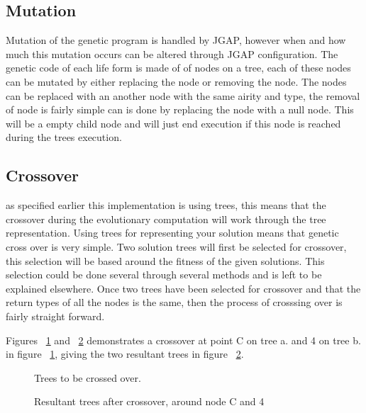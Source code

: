 \documentclass[12pt]{article}
\begin{document}
\subsection{Mutation}

Mutation of the genetic program is handled by JGAP, however when and how much this mutation occurs can be altered through JGAP
configuration. The genetic code of each life form is made of of nodes on a tree, each of these nodes can be mutated by either
replacing the node or removing the node. The nodes can be replaced with an another node with the same airity and type, the
removal of node is fairly simple can is done by replacing the node with a null node. This will be a empty child node and
will just end execution if this node is reached during the trees execution.

\subsection{Crossover}

as specified earlier this implementation is using trees, this means that the crossover during the evolutionary computation
will work through the tree representation. Using trees for representing your solution means that genetic cross over is
very simple. Two solution trees will first be selected for crossover, this selection will be based around the fitness of the given
solutions. This selection could be done several through several methods and is left to be explained elsewhere. Once two trees
have been selected for crossover and that the return types of all the nodes is the same, then the process of crosssing over
is fairly straight forward.

Figures ~\ref{fig:treesab} and ~\ref{fig:resultanttrees} demonstrates a crossover at point C on tree a. and 4 on tree b. in
figure  ~\ref{fig:treesab}, giving the two resultant trees in figure ~\ref{fig:resultanttrees}.

\begin{figure} [ht]
\centering
\subfigure[]{\label{fig:tree-a}\Tree [.1 [ 4 5 6 7 ].2 [ 8 9 ].3 ]}
\hfil
\subfigure[]{\label{fig:tree-b}\Tree [.A [ D E ].B [ F G H I ].C ]}



\caption{Trees to be crossed over.\label{fig:treesab}}
\end{figure}

\begin{figure} [ht]
\centering
\subfigure[]{\label{fig:tree-Ra}\Tree [.A [ D E ].B 4 ]}
\hfil
{}
\caption{Resultant trees after crossover, around node C and 4 \label{fig:resultanttrees}}
\end{figure}
\end{document}
